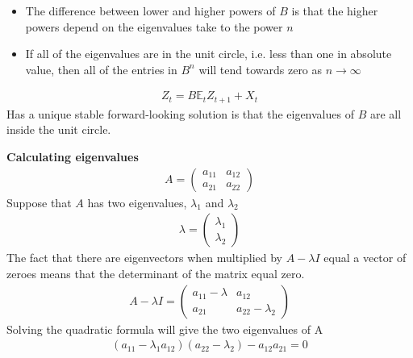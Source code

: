 \documentclass{beamer}
\begin{document}
\begin{frame}
\begin{itemize}
  \item The difference between lower and higher powers of $B$ is that the higher powers depend on the eigenvalues take to the power $n$
  \item If all of the eigenvalues are in the unit circle, i.e. less than one in absolute value, then all of the entries in $B^n$ will tend towards zero as $n \rightarrow \infty$
\end{itemize}
  \begin{align}
    Z_t=B\mathbb{E}_tZ_{t+1} + X_t
  \end{align}
  Has a unique stable forward-looking solution is that the eigenvalues of $B$ are all inside the unit circle.   
\end{frame}

\begin{frame}
  \textbf{Calculating eigenvalues}
  \begin{align}
    A = \begin{pmatrix}    a_{11} & a_{12} \\ a_{21} & a_{22}  \end{pmatrix}
  \end{align}
  Suppose that $A$ has two eigenvalues, $\lambda_1$ and $\lambda_2$
\begin{align}
  \lambda = \begin{pmatrix}
    \lambda_1 \\ \lambda_2
  \end{pmatrix}
\end{align}
The fact that there are eigenvectors when multiplied by $A-\lambda I$ equal a vector of zeroes means that the determinant of the matrix equal zero.
\begin{align}
  A-\lambda I = \begin{pmatrix}
    a_{11}-\lambda & a_{12} \\ a_{21} & a_{22}-\lambda_2
  \end{pmatrix}
\end{align}
Solving the quadratic formula will give the two eigenvalues of A
\begin{align}
  (a_{11}-\lambda_1 a_{12})(a_{22}-\lambda_2)-a_{12}a_{21}=0
\end{align}
\end{frame}
\end{document}
